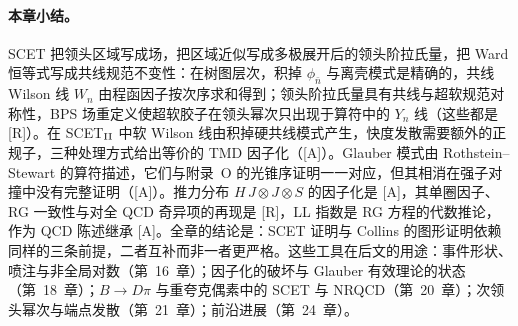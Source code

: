 \paragraph{本章小结。}
SCET 把领头区域写成场，把区域近似写成多极展开后的领头阶拉氏量，把 Ward 恒等式写成共线规范不变性：在树图层次，积掉 $\phi_{\bar n}$ 与离壳模式是精确的，共线 Wilson 线 $W_n$ 由程函因子按次序求和得到；领头阶拉氏量具有共线与超软规范对称性，BPS 场重定义使超软胶子在领头幂次只出现于算符中的 $Y_n$ 线（这些都是 [R]）。在 SCET$_{\rm II}$ 中软 Wilson 线由积掉硬共线模式产生，快度发散需要额外的正规子，三种处理方式给出等价的 TMD 因子化（[A]）。Glauber 模式由 Rothstein--Stewart 的算符描述，它们与附录~O 的光锥序证明一一对应，但其相消在强子对撞中没有完整证明（[A]）。推力分布 $H\,J\otimes J\otimes S$ 的因子化是 [A]，其单圈因子、RG 一致性与对全 QCD 奇异项的再现是 [R]，LL 指数是 RG 方程的代数推论，作为 QCD 陈述继承 [A]。全章的结论是：SCET 证明与 Collins 的图形证明依赖同样的三条前提，二者互补而非一者更严格。这些工具在后文的用途：事件形状、喷注与非全局对数（第~16~章）；因子化的破坏与 Glauber 有效理论的状态（第~18~章）；$B\to D\pi$ 与重夸克偶素中的 SCET 与 NRQCD（第~20~章）；次领头幂次与端点发散（第~21~章）；前沿进展（第~24~章）。
